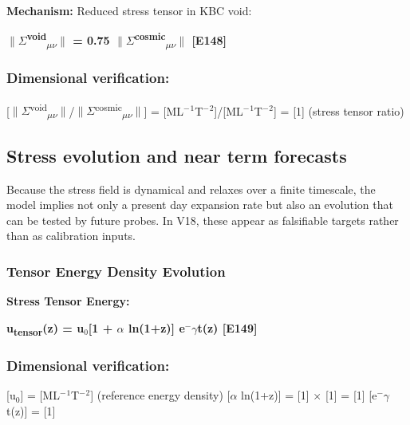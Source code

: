 \documentclass[11pt,a4paper]{article}
\begin{document}
\textbf{Mechanism:} Reduced stress tensor in KBC void:

\textbf{$\|$$\Sigma$\textsuperscript{void}\textsubscript{$\mu$$\nu$}$\|$ = 0.75 $\|$$\Sigma$\textsuperscript{cosmic}\textsubscript{$\mu$$\nu$}$\|$ [E148]}

\begin{mdframed}[linecolor=accent,linewidth=0.5pt,backgroundcolor=callout-bg,leftline=true,rightline=true,topline=true,bottomline=true,innerleftmargin=8pt,innerrightmargin=8pt,innertopmargin=6pt,innerbottommargin=6pt]
\subsubsection{Dimensional verification:}
[$\|$$\Sigma$\textsuperscript{void}\textsubscript{$\mu$$\nu$}$\|$/$\|$$\Sigma$\textsuperscript{cosmic}\textsubscript{$\mu$$\nu$}$\|$] = [ML$^{-}$$^{1}$T$^{-}$$^{2}$]/[ML$^{-}$$^{1}$T$^{-}$$^{2}$] = [1] \checkmark{} (stress tensor ratio)
\end{mdframed}

\subsection{Stress evolution and near term forecasts}
Because the stress field is dynamical and relaxes over a finite timescale, the model implies not only a present day expansion rate but also an evolution that can be tested by future probes. In V18, these appear as falsifiable targets rather than as calibration inputs.

\subsubsection{Tensor Energy Density Evolution}
\textbf{Stress Tensor Energy:}

\textbf{u\textsubscript{tensor}(z) = u$_{0}$[1 + $\alpha$ ln(1+z)] e$^{-}$$\gamma$t(z) [E149]}

\begin{mdframed}[linecolor=accent,linewidth=0.5pt,backgroundcolor=callout-bg,leftline=true,rightline=true,topline=true,bottomline=true,innerleftmargin=8pt,innerrightmargin=8pt,innertopmargin=6pt,innerbottommargin=6pt]
\subsubsection{Dimensional verification:}
[u$_{0}$] = [ML$^{-}$$^{1}$T$^{-}$$^{2}$] (reference energy density)\newline{}
[$\alpha$ ln(1+z)] = [1] $\times$ [1] = [1] \checkmark{}\newline{}
[e$^{-}$$\gamma$t(z)] = [1] \checkmark{}
\end{mdframed}
\end{document}
